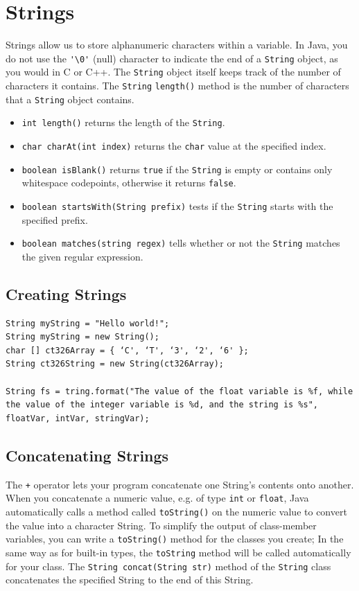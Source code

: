 \documentclass[a4paper,11pt]{article}
\begin{document}
\section{Strings}
Strings allow us to store alphanumeric characters within a variable. 
In Java, you do not use the \verb|'\0'| (null) character to indicate the end of a \verb|String| object, as you would in C or 
C++. 
The \verb|String| object itself keeps track of the number of characters it contains. 
The \verb|String| \verb|length()| method is the number of characters that a \verb|String| object contains.
\begin{itemize}
    \item   \verb|int length()| returns the length of the \verb|String|. 
    \item   \verb|char charAt(int index)| returns the \verb|char| value at the specified index. 
    \item   \verb|boolean isBlank()| returns \verb|true| if the \verb|String| is empty or contains only whitespace codepoints,
            otherwise it returns \verb|false|.
    \item   \verb|boolean startsWith(String prefix)| tests if the \verb|String| starts with the specified prefix. 
    \item   \verb|boolean matches(string regex)| tells whether or not the \verb|String| matches the given regular expression.
\end{itemize}

\subsection{Creating Strings}
\begin{verbatim}
String myString = "Hello world!"; 
String myString = new String();
char [] ct326Array = { ‘C', ‘T', ‘3', ‘2', ‘6' }; 
String ct326String = new String(ct326Array);

String fs = tring.format("The value of the float variable is %f, while the value of the integer variable is %d, and the string is %s", floatVar, intVar, stringVar); 
\end{verbatim}

\subsection{Concatenating Strings}
The \verb|+| operator lets your program concatenate one String's contents onto another. 
When you concatenate a numeric value, e.g. of type \verb|int| or \verb|float|, Java automatically calls a method called 
\verb|toString()| on the numeric value to convert the value into a character String.
To simplify the output of class-member variables, you can write a \verb|toString()| method for the classes you create; 
In the same way as for built-in types, the \verb|toString| method will be called automatically for your class.
The \texttt{String concat(String str)} method of the \verb|String| class concatenates the specified String to the
end of this String.
\end{document}
